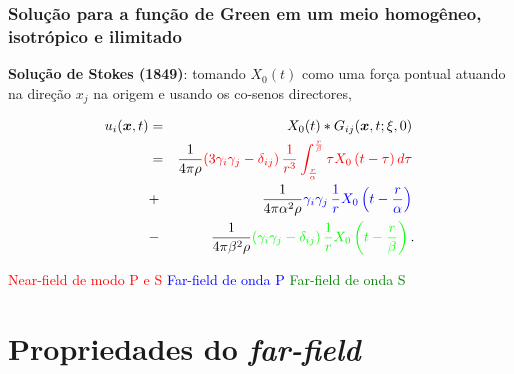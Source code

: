 \documentclass{beamer}
\newcommand{\xvec}{\vc{x}}
\newcommand{\xivec}{\boldmath \xi}
\begin{document}
\begin{frame}
	\frametitle{\textbf{Solu\c{c}\~ao para a fun\c{c}\~ao de Green em um meio homog\^eneo, isotr\'opico e ilimitado}}
	
	\begin{flushleft}
		\textbf{Solu\c{c}\~ao de Stokes (1849)}: tomando $X_{0}(t)$ como uma for\c{c}a pontual atuando na dire\c{c}\~ao $x_j$ na origem e usando os co-senos 
		directores,
	\end{flushleft}
	\begin{eqnarray*}
		\label{ten1}
		u_i(\xvec,t) &=& X_{0}(t) * G_{ij}(\xvec,t;\xivec,0)\, \\
		&=&\frac{1}{4\pi\rho} \textcolor{red}{\left(3\gamma_i\gamma_j -\delta_{ij} \right) \frac{1}{r^3}  \int_{ \frac{r }{\alpha}}^{ \frac{r}{\beta}} \tau X_{0}\left( t -\tau \right)  d\tau }\, \\      
		&+&\frac{1}{4\pi\alpha^2\rho} \textcolor{blue}{\gamma_i\gamma_j\, \frac{1}{r}  X_{0}\left(t - \frac{r}{\alpha} \right) }\, \\
		&-&\frac{1}{4\pi\beta^2\rho} \textcolor{green}{\left(\gamma_i\gamma_j -\delta_{ij} \right)  \frac{1}{r}  X_{0}\left(t - \frac{r}{\beta} \right) }\, .
	\end{eqnarray*}
	\begin{flushleft}
		\textcolor{red}{Near-field de modo P e S} \hspace{0.5cm}
		\textcolor{blue}{Far-field de onda P}\hspace{0.5cm}
		\textcolor{green}{Far-field de onda S}
	\end{flushleft}
\end{frame}%



\section{Propriedades do \textit{far-field}}
\end{document}
